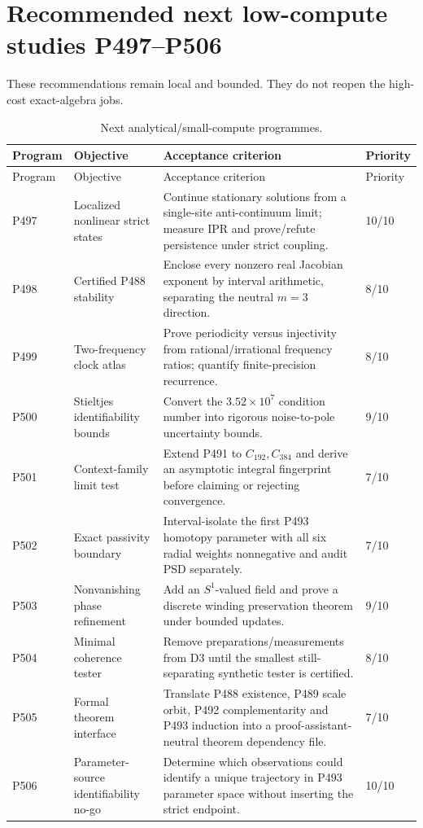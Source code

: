 \documentclass[11pt,a4paper]{article}
\theoremstyle{definition}
\theoremstyle{remark}
\begin{document}
\section{Recommended next low-compute studies P497--P506}

These recommendations remain local and bounded. They do not reopen the high-cost exact-algebra jobs.

\begin{longtable}{@{}p{}p{}p{}p{}@{}}
\caption{Next analytical/small-compute programmes.}\\
\toprule
Program & Objective & Acceptance criterion & Priority\\
\midrule
\endfirsthead
\toprule
Program & Objective & Acceptance criterion & Priority\\
\midrule
\endhead
P497 & Localized nonlinear strict states & Continue stationary solutions from a single-site anti-continuum limit; measure IPR and prove/refute persistence under strict coupling. & 10/10\\
P498 & Certified P488 stability & Enclose every nonzero real Jacobian exponent by interval arithmetic, separating the neutral $m=3$ direction. & 8/10\\
P499 & Two-frequency clock atlas & Prove periodicity versus injectivity from rational/irrational frequency ratios; quantify finite-precision recurrence. & 8/10\\
P500 & Stieltjes identifiability bounds & Convert the $3.52\times10^7$ condition number into rigorous noise-to-pole uncertainty bounds. & 9/10\\
P501 & Context-family limit test & Extend P491 to $C_{192},C_{384}$ and derive an asymptotic integral fingerprint before claiming or rejecting convergence. & 7/10\\
P502 & Exact passivity boundary & Interval-isolate the first P493 homotopy parameter with all six radial weights nonnegative and audit PSD separately. & 7/10\\
P503 & Nonvanishing phase refinement & Add an $S^1$-valued field and prove a discrete winding preservation theorem under bounded updates. & 9/10\\
P504 & Minimal coherence tester & Remove preparations/measurements from D3 until the smallest still-separating synthetic tester is certified. & 8/10\\
P505 & Formal theorem interface & Translate P488 existence, P489 scale orbit, P492 complementarity and P493 induction into a proof-assistant-neutral theorem dependency file. & 7/10\\
P506 & Parameter-source identifiability no-go & Determine which observations could identify a unique trajectory in P493 parameter space without inserting the strict endpoint. & 10/10\\
\bottomrule
\end{longtable}
\end{document}
